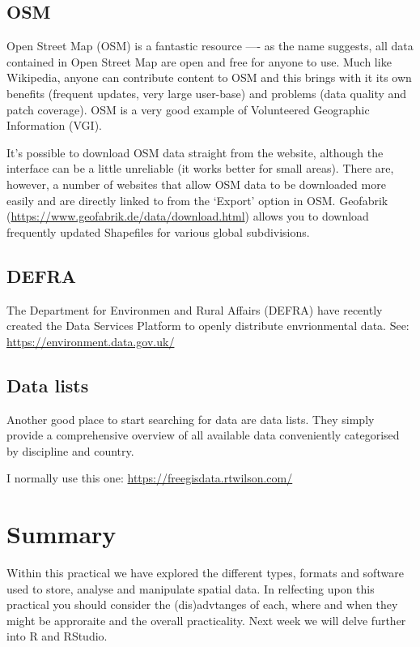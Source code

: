 \documentclass[]{book}
\begin{document}
\hypertarget{osm}{%
\subsection{OSM}\label{osm}}

Open Street Map (OSM) is a fantastic resource ---- as the name suggests, all data contained in Open Street Map are open and free for anyone to use. Much like Wikipedia, anyone can contribute content to OSM and this brings with it its own benefits (frequent updates, very large user-base) and problems (data quality and patch coverage). OSM is a very good example of Volunteered Geographic Information (VGI).

It's possible to download OSM data straight from the website, although the interface can be a little unreliable (it works better for small areas). There are, however, a number of websites that allow OSM data to be downloaded more easily and are directly linked to from the `Export' option in OSM. Geofabrik (\url{https://www.geofabrik.de/data/download.html}) allows you to download frequently updated Shapefiles for various global subdivisions.

\hypertarget{defra}{%
\subsection{DEFRA}\label{defra}}

The Department for Environmen and Rural Affairs (DEFRA) have recently created the Data Services Platform to openly distribute envrionmental data. See: \url{https://environment.data.gov.uk/}

\hypertarget{data-lists}{%
\subsection{Data lists}\label{data-lists}}

Another good place to start searching for data are data lists. They simply provide a comprehensive overview of all available data conveniently categorised by discipline and country.

I normally use this one: \url{https://freegisdata.rtwilson.com/}

\hypertarget{summary}{%
\section{Summary}\label{summary}}

Within this practical we have explored the different types, formats and software used to store, analyse and manipulate spatial data. In relfecting upon this practical you should consider the (dis)advtanges of each, where and when they might be approraite and the overall practicality. Next week we will delve further into R and RStudio.
\end{document}
